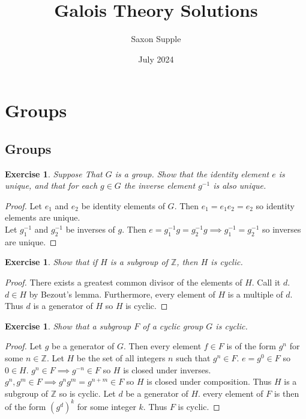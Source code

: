 \documentclass{article}
\title{Galois Theory Solutions}
\author{Saxon Supple}
\date{July 2024}
\newtheorem{exercise}[theorem]{Exercise}
\begin{document}
\maketitle

\section{Groups}

\subsection{Groups}
\begin{exercise}
Suppose That $G$ is a group. Show that the identity element $e$ is unique, and that for each $g\in G$ the inverse element $g^{-1}$ is also unique.
\end{exercise}
\begin{proof}
Let $e_1$ and $e_2$ be identity elements of $G$. Then $e_1=e_1e_2=e_2$ so identity elements are unique.\\
Let $g_1^{-1}$ and $g_2^{-1}$ be inverses of $g$. Then $e=g_1^{-1}g=g_2^{-1}g\implies g_1^{-1}=g_2^{-1}$ so inverses are unique.
\end{proof}

\begin{exercise}
Show that if $H$ is a subgroup of $\mathbb{Z}$, then $H$ is cyclic.
\end{exercise}
\begin{proof}
There exists a greatest common divisor of the elements of $H$. Call it $d$. $d\in H$ by Bezout's lemma. Furthermore, every element of $H$ is a multiple of $d$. Thus $d$ is a generator of $H$ so $H$ is cyclic.
\end{proof}

\begin{exercise}
Show that a subgroup $F$ of a cyclic group $G$ is cyclic.
\end{exercise}
\begin{proof}
Let $g$ be a generator of $G$. Then every element $f\in F$ is of the form $g^n$ for some $n\in \mathbb{Z}$. Let $H$ be the set of all integers $n$ such that $g^n\in F$. $e=g^0\in F$ so $0\in H$. $g^n\in F\implies g^{-n}\in F$ so $H$ is closed under inverses. $g^n,g^m\in F\implies g^ng^m=g^{n+m}\in F$ so $H$ is closed under composition. Thus $H$ is a subgroup of $\mathbb{Z}$ so is cyclic. Let $d$ be a generator of $H$. every element of $F$ is then of the form ${(g^d)}^k$ for some integer $k$. Thus $F$ is cyclic.
\end{proof}
\end{document}
